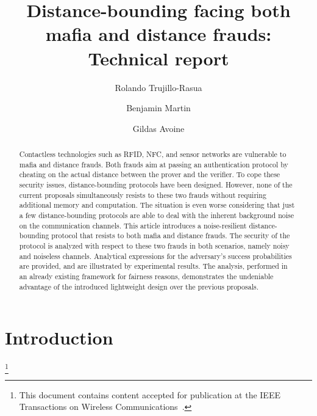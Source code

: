 \documentclass{llncs}
\newcommand\blfootnote[1]{\begingroup
  \renewcommand\thefootnote{}\footnote{#1}\addtocounter{footnote}{-1}\endgroup
}
\begin{document}
\title{Distance-bounding facing both mafia and distance frauds: Technical 
report }

\author{Rolando Trujillo-Rasua\and Benjamin Martin\and Gildas 
Avoine}




\maketitle
\thispagestyle{plain}
\begin{abstract}
Contactless technologies such as RFID, NFC, and sensor networks are vulnerable to mafia and distance frauds. Both frauds aim at passing an authentication protocol by cheating on the actual distance between the prover and the verifier. To cope these security issues, distance-bounding protocols have been designed. However, none of the current proposals simultaneously resists to these two frauds without requiring additional memory and computation. The situation is even worse considering that just a few distance-bounding protocols are able to deal with the inherent background noise on the communication channels. This article introduces a noise-resilient distance-bounding protocol that resists to both mafia and distance frauds. The security of the protocol is analyzed with respect to these two frauds in both scenarios, namely noisy and noiseless channels. Analytical expressions for the adversary's success probabilities are provided, and are illustrated by experimental results. The analysis, performed in an already existing framework for fairness reasons, demonstrates the undeniable advantage of the introduced lightweight design over the previous proposals.

\end{abstract}

\section{Introduction}
\blfootnote{This document contains content accepted for publication at the IEEE 
Transactions on Wireless Communications~\cite{TMA2014}.}
\end{document}
